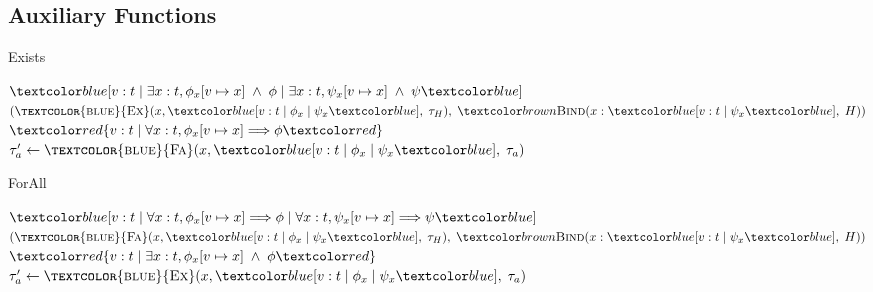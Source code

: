 \newpage

\subsection{Auxiliary Functions}

\begin{algorithm}[ht]
    \caption{Exists}\label{alg:ex}
    \begin{algorithmic}[1]
            \Match {$\tau$}
                    \State \Return $\under{v: t \;|\; \exists x: t, \phi_x[v \mapsto x] \;\land\; \phi \;|\; \exists x: t, \psi_x[v \mapsto x] \;\land\; \psi}$
                \EndCase
                    \State \Return $(\Call{\textcolor{blue}{Ex}}{x, \under{v: t \;|\; \phi_x \;|\; \psi_x}, \;\tau_H}, \;\bind(x:\under{v: t \;|\; \psi_x}, \;H))$
                \EndCase
                    \State \Return $\overa{v: t \;|\; \forall x: t, \phi_x[v \mapsto x] \Longrightarrow \phi}$
                \EndCase
                    \State $\tau_a' \gets \Call{\textcolor{blue}{Fa}}{x, \under{v: t \;|\; \phi_x \;|\; \psi_x}, \;\tau_a}$
                    \State {}
                \EndCase
            \EndMatch
        \EndProcedure
    \end{algorithmic}
\end{algorithm}

\begin{algorithm}[ht]
    \caption{ForAll}\label{alg:forall}
    \begin{algorithmic}[1]
            \Match {$\tau$}
                    \State \Return $\under{v: t \;|\; \forall x: t, \phi_x[v \mapsto x] \Longrightarrow \phi \;|\; \forall x: t, \psi_x[v \mapsto x] \Longrightarrow \psi}$
                \EndCase
                    \State \Return $(\Call{\textcolor{blue}{Fa}}{x, \under{v: t \;|\; \phi_x \;|\; \psi_x}, \;\tau_H}, \;\bind(x:\under{v: t \;|\; \psi_x}, \;H))$
                \EndCase
                    \State \Return $\overa{v: t \;|\; \exists x: t, \phi_x[v \mapsto x] \;\land\; \phi}$
                \EndCase
                    \State $\tau_a' \gets \Call{\textcolor{blue}{Ex}}{x, \under{v: t \;|\; \phi_x \;|\; \psi_x}, \;\tau_a}$
                    \State {}
                \EndCase
            \EndMatch
        \EndProcedure
    \end{algorithmic}
\end{algorithm}

